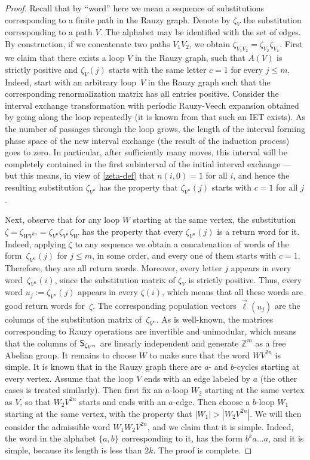 \documentclass[11pt]{article}
\numberwithin{equation}{section}\newcommand{\Relation}[2][]{}\newtheorem*{prop*}{Proposition}
\theoremstyle{plain}
\theoremstyle{definition}
\newcommand{\Z}{\mathbb{Z}}
\newcommand\Sf{{\sf S}}
\begin{document}
\begin{proof}
Recall that by ``word'' here we mean a sequence of substitutions corresponding to a finite path in the Rauzy graph. Denote by $\zeta_V$ the substitution corresponding to a path $V$.
The
alphabet may be identified with the set of edges. By construction, if we concatenate two paths $V_1 V_2$, we obtain
$
\zeta_{V_1 V_2} = \zeta_{V_2} \zeta_{V_1}.
$
First we claim that there exists a loop $V$ in the Rauzy graph, such that $A(V)$ is strictly positive and $\zeta_V(j)$ starts with the same letter $c=1$ for every $j\le m$.
Indeed, start with an arbitrary loop~$V$ in the Rauzy graph such that the corresponding renormalization matrix has all entries positive. Consider the interval exchange transformation with periodic
Rauzy-Veech expansion obtained by going along the loop repeatedly (it is known from \cite{veech} that such an IET exists).
As the number of passages through the loop grows, the length of the interval forming phase space of the new interval exchange (the result of the induction process) goes to zero. In particular, after sufficiently many moves, this interval will be completely contained in the first subinterval of the initial interval exchange --- but this means, in view of \eqref{zeta-def} that $n(i,0)=1$ for all $i$, and hence the resulting substitution
$\zeta_{V^n}$
has the property that
$\zeta_{V^n}(j)$
starts with $c=1$ for all $j$.\enlargethispage{.5\baselineskip}%

Next, observe that for any loop $W$ starting at the same vertex, the substitution
$\zeta=
\zeta_{WV^{2n}} = \zeta_{V^n}\zeta_{V^n}\zeta_W$ has the property that every $\zeta_{V^n}(j)$ is a return word for it. Indeed, applying $\zeta$ to any sequence we obtain a concatenation of words of the form~$\zeta_{V^n}(j)$ for $j\le m$, in some order, and every one of them starts with $c=1$. Therefore, they are all return words. Moreover, every letter $j$ appears in every
word~$\zeta_{V^n}(i)$, since the substitution matrix of $\zeta_V$ is strictly positive. Thus,
every word $u_j:=
\zeta_{V^n}(j)$ appears in every $\zeta(i)$, which means that all these words are good return words for~$\zeta$. The corresponding population vectors
$\vec\ell(u_j)$ are the columns of the substitution matrix of~$\zeta_{V^n}$. As is well-known, the matrices corresponding to Rauzy operations are invertible and unimodular, which means that the columns of $\Sf_{\zeta_{V^n}}$ are linearly independent and generate $\Z^m$ as a free Abelian group.
It remains to choose $W$ to make sure that the word $WV^{2n}$ is simple. It is known that in the Rauzy graph there are $a$- and $b$-cycles starting at every vertex. Assume that the loop $V$ ends with an edge labeled by $a$ (the other cases is treated similarly). Then first fix an $a$-loop $W_2$ starting at the same vertex as $V$, so that $W_2 V^{2n}$ starts and ends with an $a$-edge. Then choose a $b$-loop $W_1$ starting at the same vertex, with the property that
$|W_1|> |W_2 V^{2n}|$. We will then consider the admissible word $W_1 W_2 V^{2n}$, and we claim that it is simple. Indeed, the word in the alphabet $\{a,b\}$ corresponding to it, has the form $b^k a\ldots a$, and it is simple, because its length is less than $2k$. The proof is complete.
\end{proof}
\end{document}
